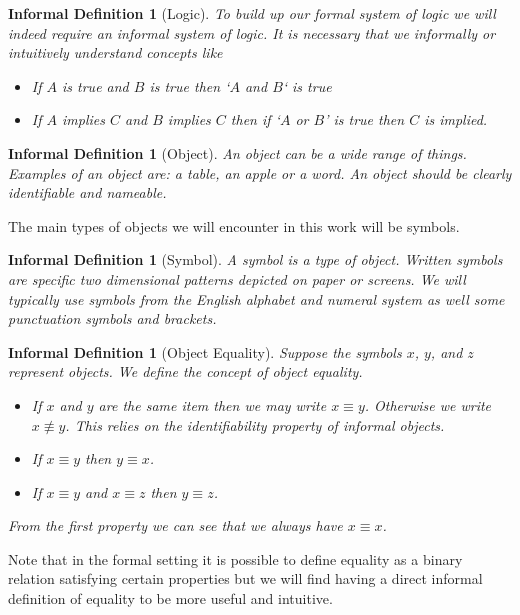 \documentclass[12pt]{article}
\theoremstyle{break}
\theoremstyle{break}
\theoremstyle{break}
\theoremstyle{break}
\theoremstyle{break}
\newtheorem{informal definition}[definition]{Informal Definition}
\begin{document}
\begin{informal definition}[Logic]
To build up our formal system of logic we will indeed require an informal system of logic.
It is necessary that we informally or intuitively understand concepts like
\begin{itemize}
\item{If $A$ is true and $B$ is true then `$A$ and $B$` is true}
\item{If $A$ implies $C$ and $B$ implies $C$ then if `$A$ or $B$' is true then $C$ is implied.}
\end{itemize}
\end{informal definition}

\begin{informal definition}[Object]
An object can be a wide range of things.
Examples of an object are: a table, an apple or a word.
An object should be clearly identifiable and nameable.
\end{informal definition}

The main types of objects we will encounter in this work will be symbols.
\begin{informal definition}[Symbol]
A symbol is a type of object.
Written symbols are specific two dimensional patterns depicted on paper or screens.
We will typically use symbols from the English alphabet and numeral system as well some punctuation symbols and brackets.
\end{informal definition}

\begin{informal definition}[Object Equality]
Suppose the symbols $x$, $y$, and $z$ represent objects.
We define the concept of object equality.
\begin{itemize}
\item{If $x$ and $y$ are the same item then we may write $x\equiv y$. Otherwise we write $x\not \equiv y$. This relies on the identifiability property of informal objects.}
\item{If $x\equiv y$ then $y\equiv x$.}
\item{If $x\equiv y$ and $x\equiv z$ then $y\equiv z$.}
\end{itemize}
From the first property we can see that we always have $x\equiv x$.
\end{informal definition}
Note that in the formal setting it is possible to define equality as a binary relation satisfying certain properties but we will find having a direct informal definition of equality to be more useful and intuitive.
\end{document}

